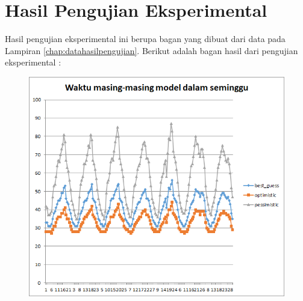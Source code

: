 \chapter{Hasil Pengujian Eksperimental}
\label{chap:hasilpengujianeksperimental}

Hasil pengujian eksperimental ini berupa bagan yang dibuat dari data pada Lampiran \ref{chap:datahasilpengujian}. Berikut adalah bagan hasil dari pengujian eksperimental :

\begin{figure}[H]
				\centering		
				\includegraphics[scale=0.7]{Gambar/waktuallmodelsampel117072017normal.png}
\end{figure}
\newpage
			

